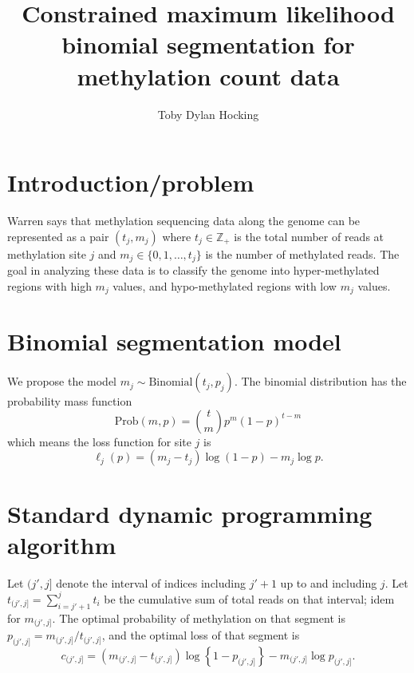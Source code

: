 \documentclass[12pt]{article}
\newcommand{\ZZ}{\mathbb Z}
\begin{document}
\title{Constrained maximum likelihood binomial segmentation for
  methylation count data}

\author{Toby Dylan Hocking}

\maketitle

\section{Introduction/problem}

Warren says that methylation sequencing data along the genome can be
represented as a pair $(t_j, m_j)$ where $t_j\in\ZZ_+$ is the total
number of reads at methylation site $j$ and $m_j\in\{0,1,\dots, t_j\}$
is the number of methylated reads. The goal in analyzing these data is
to classify the genome into hyper-methylated regions with high $m_j$
values, and hypo-methylated regions with low $m_j$ values.

\section{Binomial segmentation model}

We propose the model $m_j \sim \text{Binomial}(t_j, p_j)$. The
binomial distribution has the probability mass function
\begin{equation}
  \label{eq:binomial-prob}
  \text{Prob}(m, p) = \binom{t}{m} p^m (1-p)^{t-m}
\end{equation}
which means the loss function for site $j$ is
\begin{equation}
  \label{eq:binomial-loss}
  \ell_j(p) = (m_j - t_j) \log(1-p) - m_j\log p.
\end{equation}

\section{Standard dynamic programming algorithm}

Let $(j', j]$ denote the interval of indices including $j'+1$ up to
and including $j$. Let $t_{(j', j]} = \sum_{i=j'+1}^{j} t_i$ be the
cumulative sum of total reads on that interval; idem for $m_{(j',
  j]}$. The optimal probability of methylation on that segment is
$p_{(j', j]} = m_{(j', j]}/t_{(j', j]}$, and the optimal loss of that
segment is
\begin{equation}
  \label{eq:optimal-cost}
  c_{(j', j]} = 
  ( m_{(j', j]} - t_{(j', j]} )
  \log\left\{ 
    1 - p_{(j', j]}
  \right\}
  - m_{(j', j]}
  \log p_{(j', j]}.
\end{equation}
\end{document}
